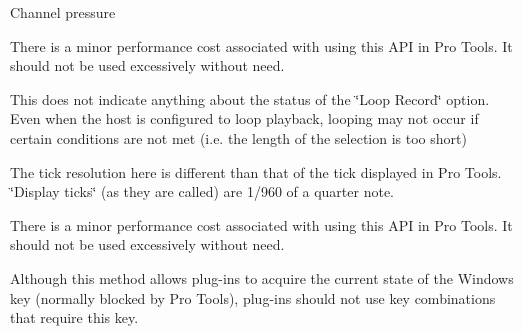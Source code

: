 \begin{DoxyRefList}
\begin{DoxyItemize}
\item Channel pressure 
\end{DoxyItemize}
\item[Member \mbox{\hyperlink{a01885_a51aebee28b9d285863c3527e936dd733}{A\+A\+X\+\_\+\+I\+Transport::Get\+Bar\+Beat\+Position}} (int32\+\_\+t $\ast$\+Bars, int32\+\_\+t $\ast$\+Beats, int64\+\_\+t $\ast$\+Display\+Ticks, int64\+\_\+t Sample\+Location) const =0]\label{a00786__compatibility_notes000063}%
%
 There is a minor performance cost associated with using this A\+PI in Pro Tools. It should not be used excessively without need. 
\item[Member \mbox{\hyperlink{a01885_a386bade7d8902130a02c6e6dc8b2123b}{A\+A\+X\+\_\+\+I\+Transport::Get\+Current\+Loop\+Position}} (bool $\ast$b\+Looping, int64\+\_\+t $\ast$\+Loop\+Start\+Tick, int64\+\_\+t $\ast$\+Loop\+End\+Tick) const =0]\label{a00786__compatibility_notes000061}%
%
 This does not indicate anything about the status of the \char`\"{}\+Loop Record\char`\"{} option. Even when the host is configured to loop playback, looping may not occur if certain conditions are not met (i.\+e. the length of the selection is too short) 
\item[Member \mbox{\hyperlink{a01885_a2d99dca311ddca98c4d455078edd42d5}{A\+A\+X\+\_\+\+I\+Transport::Get\+Current\+Tick\+Position}} (int64\+\_\+t $\ast$\+Tick\+Position) const =0]\label{a00786__compatibility_notes000060}%
%
 The tick resolution here is different than that of the tick displayed in Pro Tools. \char`\"{}\+Display ticks\char`\"{} (as they are called) are 1/960 of a quarter note. 
\item[Member \mbox{\hyperlink{a01885_a85aae48051f8596e8145268ecf173dcb}{A\+A\+X\+\_\+\+I\+Transport::Get\+Custom\+Tick\+Position}} (int64\+\_\+t $\ast$o\+Tick\+Position, int64\+\_\+t i\+Sample\+Location) const =0]\label{a00786__compatibility_notes000062}%
%
 There is a minor performance cost associated with using this A\+PI in Pro Tools. It should not be used excessively without need. 
\item[Member \mbox{\hyperlink{a01889_ac2fe16f6d81a8d941e36242d9f9d0980}{A\+A\+X\+\_\+\+I\+View\+Container::Get\+Modifiers}} (uint32\+\_\+t $\ast$out\+Modifiers)=0]\label{a00786__compatibility_notes000064}%
%
 Although this method allows plug-\/ins to acquire the current state of the Windows key (normally blocked by Pro Tools), plug-\/ins should not use key combinations that require this key. 

\end{DoxyRefList}
